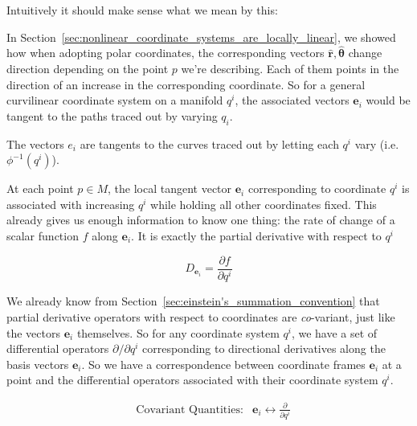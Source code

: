 \documentclass[../master.tex]{subfiles}
\begin{document}
	 Intuitively it should make sense what we mean by this: 
	
	
	In Section~\ref{sec:nonlinear_coordinate_systems_are_locally_linear}, we showed how when adopting polar coordinates, the corresponding vectors $\hat{\mathbf{r}},\hat{\mathbf{\theta}}$ change direction depending on the point $p$ we're describing. Each of them points in the direction of an increase in the corresponding coordinate. So for a general curvilinear coordinate system on a manifold $q^i$, the associated vectors $\mathbf e_i$ would be tangent to the paths traced out by varying $q_i$. 
	
	The vectors $e_i$ are tangents to the curves traced out by letting each $q^i$ vary (i.e. $\phi^{-1} (q^i)$). 
	
	At each point $p \in M$, the local tangent vector $\mathbf e_i$ corresponding to coordinate $q^i$ is associated with increasing $q^i$ while holding all other coordinates fixed. This already gives us enough information to know one thing: the rate of change of a scalar function $f$ along $\mathbf e_i$. It is exactly the partial derivative with respect to $q^i$
	
	\begin{equation}
		D_{\mathbf e_i} = \frac{\partial f}{\partial q^i}
	\end{equation}
	
	We already know from Section~\ref{sec:einstein's_summation_convention} that partial derivative operators with respect to coordinates are \emph{co}-variant, just like the vectors $\mathbf e_i$ themselves. So for any coordinate system $q^i$, we have a set of differential operators $\partial/\partial q^i$ corresponding to directional derivatives along the basis vectors $\mathbf e_i$. So we have a correspondence between coordinate frames $\mathbf e_i$ at a point and the differential operators associated with their coordinate system $q^i$.
	
	\begin{align*}
		&\text{Covariant Quantities:}&  \mathbf e_i \longleftrightarrow \frac{\partial}{\partial q^i}
	\end{align*}
	
\end{document}
